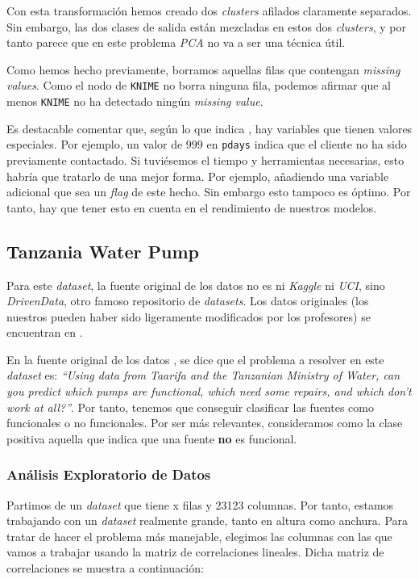 \documentclass[11pt]{article}
\begin{document}
Con esta transformación hemos creado dos \emph{clusters} afilados claramente separados. Sin embargo, las dos clases de salida están mezcladas en estos dos \emph{clusters}, y por tanto parece que en este problema \emph{PCA} no va a ser una técnica útil.

Como hemos hecho previamente, borramos aquellas filas que contengan \emph{missing values}. Como el nodo de \lstinline{KNIME} no borra ninguna fila, podemos afirmar que al menos \lstinline{KNIME} no ha detectado ningún \emph{missing value}.

Es destacable comentar que, según lo que indica \cite{bank_marketing_source:online}, hay variables que tienen valores especiales. Por ejemplo, un valor de $999$ en \lstinline{pdays} indica que el cliente no ha sido previamente contactado. Si tuviésemos el tiempo y herramientas necesarias, esto habría que tratarlo de una mejor forma. Por ejemplo, añadiendo una variable adicional que sea un \emph{flag} de este hecho. Sin embargo esto tampoco es óptimo. Por tanto, hay que tener esto en cuenta en el rendimiento de nuestros modelos.

\pagebreak

\subsection{Tanzania Water Pump}

Para este \emph{dataset}, la fuente original de los datos no es ni \emph{Kaggle} ni \emph{UCI}, sino \emph{DrivenData}, otro famoso repositorio de \emph{datasets}. Los datos originales (los nuestros pueden haber sido ligeramente modificados por los profesores) se encuentran en \cite{tanzania_source:online}.

En la fuente original de los datos \cite{tanzania_source:online}, se dice que el problema a resolver en este \emph{dataset} es: \emph{``Using data from Taarifa and the Tanzanian Ministry of Water, can you predict which pumps are functional, which need some repairs, and which don't work at all?''}. Por tanto, tenemos que conseguir clasificar las fuentes como funcionales o no funcionales. Por ser más relevantes, consideramos como la clase positiva aquella que indica que una fuente \textbf{no} es funcional.

\subsubsection{Análisis Exploratorio de Datos}

Partimos de un \emph{dataset} que tiene x filas y 23123 columnas. Por tanto, estamos trabajando con un \emph{dataset} realmente grande, tanto en altura como anchura. Para tratar de hacer el problema más manejable, elegimos las columnas con las que vamos a trabajar usando la matriz de correlaciones lineales. Dicha matriz de correlaciones se muestra a continuación:
\end{document}
